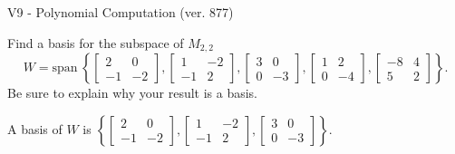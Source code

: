 \begin{exercise}
  \begin{exerciseTitle}V9 - Polynomial Computation (ver. 877)\end{exerciseTitle}
  \begin{exerciseStatement}
    Find a basis for the subspace of \(M_{2,2}\) 
\[W=\mathrm{span}\ \left\{\left[\begin{array}{cc}
2 & 0 \\
-1 & -2
\end{array}\right] , \left[\begin{array}{cc}
1 & -2 \\
-1 & 2
\end{array}\right] , \left[\begin{array}{cc}
3 & 0 \\
0 & -3
\end{array}\right] , \left[\begin{array}{cc}
1 & 2 \\
0 & -4
\end{array}\right] , \left[\begin{array}{cc}
-8 & 4 \\
5 & 2
\end{array}\right]\right\}.\]
 Be sure to explain why your result is a basis.


  \end{exerciseStatement}
  \begin{exerciseAnswer}
   A basis of \(W\) is  \(\left\{\left[\begin{array}{cc}
2 & 0 \\
-1 & -2
\end{array}\right] , \left[\begin{array}{cc}
1 & -2 \\
-1 & 2
\end{array}\right] , \left[\begin{array}{cc}
3 & 0 \\
0 & -3
\end{array}\right]\right\}\).
  


  \end{exerciseAnswer}
\end{exercise}